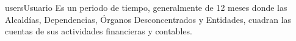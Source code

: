 \begin{cdtEntidad}{users}{Usuario}{
    Es un periodo de tiempo, generalmente de 12 meses donde las Alcaldías, Dependencias, Órganos Desconcentrados y Entidades, cuadran las cuentas de sus actividades financieras y contables.}




        

	   
\end{cdtEntidad}

